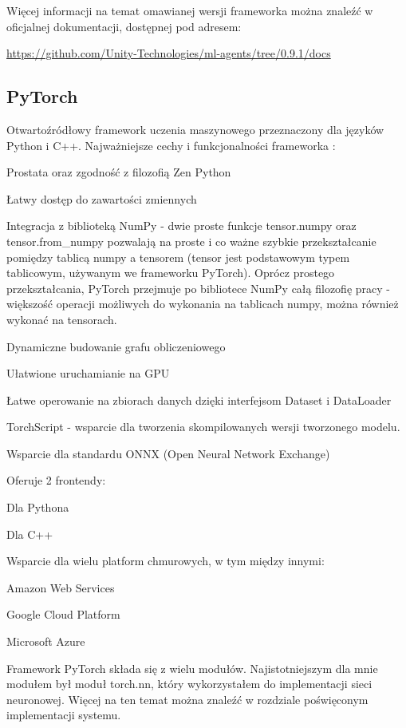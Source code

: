 Więcej informacji na temat omawianej wersji frameworka można znaleźć w oficjalnej dokumentacji, dostępnej pod adresem:
\begin{center}
\url{https://github.com/Unity-Technologies/ml-agents/tree/0.9.1/docs}
\end{center}

\subsection{PyTorch}
Otwartoźródłowy framework uczenia maszynowego przeznaczony dla języków Python i C++.
Najważniejsze cechy i funkcjonalności frameworka \cite{pytorch:features}\cite{pytorch:vs:tensorflow}:
\begin{enumerate*}
\item Prostata oraz zgodność z filozofią Zen Python \cite{python:zen}
\item Łatwy dostęp do zawartości zmiennych
\item Integracja z biblioteką NumPy - dwie proste funkcje tensor.numpy oraz tensor.from\_numpy pozwalają na proste i co ważne szybkie przekształcanie pomiędzy tablicą numpy a tensorem (tensor jest podstawowym typem tablicowym, używanym we frameworku PyTorch). Oprócz prostego przekształcania, PyTorch przejmuje po bibliotece NumPy całą filozofię pracy - większość operacji możliwych do wykonania na tablicach numpy, można również wykonać na tensorach.
\item Dynamiczne budowanie grafu obliczeniowego \cite{pytorch:understandingGraphs}
\item Ułatwione uruchamianie na GPU
\item Łatwe operowanie na zbiorach danych dzięki interfejsom Dataset i DataLoader
\item TorchScript - wsparcie dla tworzenia skompilowanych wersji tworzonego modelu.
\item Wsparcie dla standardu ONNX (Open Neural Network Exchange)
\item Oferuje 2 frontendy:
\begin{itemize*}
\item Dla Pythona
\item Dla C++
\end{itemize*}
\item Wsparcie dla wielu platform chmurowych, w tym między innymi:
\begin{itemize*}
\item Amazon Web Services
\item Google Cloud Platform
\item Microsoft Azure
\end{itemize*}
\end{enumerate*}
Framework PyTorch składa się z wielu modułów. Najistotniejszym dla mnie modułem był moduł torch.nn, który wykorzystałem do implementacji sieci neuronowej. Więcej na ten temat można znaleźć w rozdziale poświęconym implementacji systemu.

